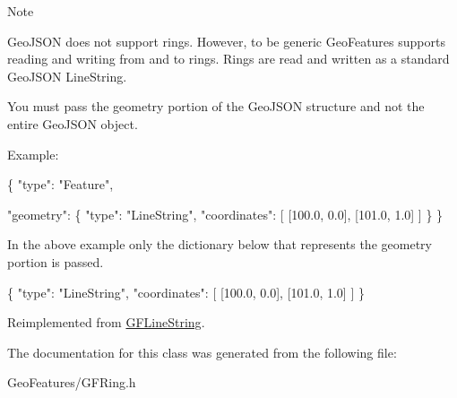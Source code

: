 \begin{DoxyNote}{Note}


Geo\+J\+S\+O\+N does not support rings. However, to be generic Geo\+Features supports reading and writing from and to rings. Rings are read and written as a standard Geo\+J\+S\+O\+N Line\+String.

You must pass the geometry portion of the Geo\+J\+S\+O\+N structure and not the entire Geo\+J\+S\+O\+N object.

Example\+:


\begin{DoxyCode}
\{
      \textcolor{stringliteral}{"type"}: \textcolor{stringliteral}{"Feature"},

      \textcolor{stringliteral}{"geometry"}: \{ \textcolor{stringliteral}{"type"}: \textcolor{stringliteral}{"LineString"},
                    \textcolor{stringliteral}{"coordinates"}: [ [100.0, 0.0], [101.0, 1.0] ]
                  \}
 \}
\end{DoxyCode}


In the above example only the dictionary below that represents the geometry portion is passed.


\begin{DoxyCode}
\{
      \textcolor{stringliteral}{"type"}: \textcolor{stringliteral}{"LineString"},
      \textcolor{stringliteral}{"coordinates"}: [ [100.0, 0.0], [101.0, 1.0] ]
\}
\end{DoxyCode}
 
\end{DoxyNote}


Reimplemented from \hyperlink{interface_g_f_line_string_ad7a913bc12b6099982229190d1debd71}{G\+F\+Line\+String}.



The documentation for this class was generated from the following file\+:\begin{DoxyCompactItemize}
\item 
Geo\+Features/G\+F\+Ring.\+h\end{DoxyCompactItemize}
